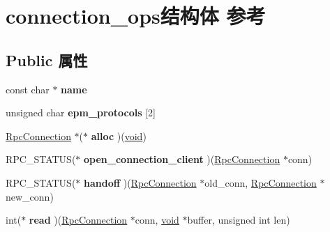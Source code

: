 \hypertarget{structconnection__ops}{}\section{connection\+\_\+ops结构体 参考}
\label{structconnection__ops}
\subsection*{Public 属性}
\begin{DoxyCompactItemize}
\item 
\mbox{\label{structconnection__ops_acc81922ba39384831bac8f5cb6f71a2c}} 
const char $\ast$ {\bfseries name}
\item 
\mbox{\label{structconnection__ops_a273062d8372e3d7135b82ed605d4f3d9}} 
unsigned char {\bfseries epm\+\_\+protocols} \mbox{[}2\mbox{]}
\item 
\mbox{\label{structconnection__ops_acb8869a1f40eecf242093cc02f27ef39}} 
\hyperlink{struct___rpc_connection}{Rpc\+Connection} $\ast$($\ast$ {\bfseries alloc} )(\hyperlink{interfacevoid}{void})
\item 
\mbox{\label{structconnection__ops_aa91d77c6eb875b4dc66497c54f6625e2}} 
R\+P\+C\+\_\+\+S\+T\+A\+T\+US($\ast$ {\bfseries open\+\_\+connection\+\_\+client} )(\hyperlink{struct___rpc_connection}{Rpc\+Connection} $\ast$conn)
\item 
\mbox{\label{structconnection__ops_ac6f6569786a0cf662f1b3dcd1cda83e8}} 
R\+P\+C\+\_\+\+S\+T\+A\+T\+US($\ast$ {\bfseries handoff} )(\hyperlink{struct___rpc_connection}{Rpc\+Connection} $\ast$old\+\_\+conn, \hyperlink{struct___rpc_connection}{Rpc\+Connection} $\ast$new\+\_\+conn)
\item 
\mbox{\label{structconnection__ops_a1e784479387e2921cc5d598a94243610}} 
int($\ast$ {\bfseries read} )(\hyperlink{struct___rpc_connection}{Rpc\+Connection} $\ast$conn, \hyperlink{interfacevoid}{void} $\ast$buffer, unsigned int len)
\item 
\mbox{\label{structconnection__ops_a6d0f01ccf30a5a00aaff142dcbe32857}} 

\end{DoxyCompactItemize}
